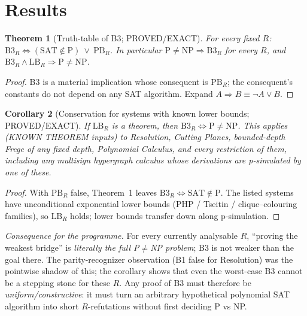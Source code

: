 \documentclass[11pt]{article}
\newtheorem{theorem}{Theorem}
\newtheorem{corollary}[theorem]{Corollary}
\theoremstyle{definition}
\newcommand{\SAT}{\mathrm{SAT}}
\begin{document}
\section{Results}

\begin{theorem}[Truth-table of B3; PROVED/EXACT]
For every fixed $R$: \ $\mathrm{B3}_R \iff (\SAT\notin\mathrm P)\ \vee\ \mathrm{PB}_R$.
In particular $\mathrm{P}\ne\mathrm{NP}\Rightarrow \mathrm{B3}_R$ for every $R$, and
$\mathrm{B3}_R\wedge \mathrm{LB}_R\Rightarrow \mathrm P\neq\mathrm{NP}$.
\end{theorem}
\begin{proof}
B3 is a material implication whose consequent is $\mathrm{PB}_R$; the
consequent's constants do not depend on any SAT algorithm. Expand
$A\Rightarrow B\equiv\neg A\vee B$.
\end{proof}

\begin{corollary}[Conservation for systems with known lower bounds; PROVED/EXACT]
If $\mathrm{LB}_R$ is a theorem, then $\mathrm{B3}_R\iff \mathrm P\neq\mathrm{NP}$.
This applies (KNOWN THEOREM inputs) to Resolution, Cutting Planes,
bounded-depth Frege of any fixed depth, Polynomial Calculus, and every
restriction of them, including any multisign hypergraph calculus whose
derivations are p-simulated by one of these.
\end{corollary}
\begin{proof}
With $\mathrm{PB}_R$ false, Theorem~1 leaves $\mathrm{B3}_R\iff\SAT\notin\mathrm P$.
The listed systems have unconditional exponential lower bounds
(PHP / Tseitin / clique--colouring families), so $\mathrm{LB}_R$ holds;
lower bounds transfer down along p-simulation.
\end{proof}

\noindent\emph{Consequence for the programme.} For every currently analysable
$R$, ``proving the weakest bridge'' is \emph{literally the full P$\ne$NP
problem}; B3 is not weaker than the goal there. The parity-recognizer
observation (B1 false for Resolution) was the pointwise shadow of this; the
corollary shows that even the worst-case B3 cannot be a stepping stone for
these $R$. Any proof of B3 must therefore be \emph{uniform/constructive}: it
must turn an arbitrary hypothetical polynomial SAT algorithm into short
$R$-refutations without first deciding P vs NP.
\end{document}
